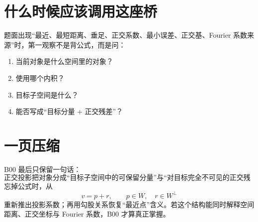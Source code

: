 \documentclass[profile=standard]{ipara-handbook}
\begin{document}
\section{什么时候应该调用这座桥}
题面出现“最近、最短距离、垂足、正交系数、最小误差、正交基、Fourier 系数来源”时，第一观察不是背公式，而是问：
\begin{enumerate}
\item 当前对象是什么空间里的对象？
\item 使用哪个内积？
\item 目标子空间是什么？
\item 能否写成“目标分量 + 正交残差”？
\end{enumerate}

\section{一页压缩}
B00 最后只保留一句话：
\[
\boxed{
\text{正交投影把对象分成“目标子空间中的可保留分量”与“对目标完全不可见的正交残差”。}
}
\]
忘掉公式时，从
\[
v=p+r,\qquad p\in W,\quad r\in W^\perp
\]
重新推出投影系数；再用勾股关系恢复“最近点”含义。若这个结构能同时解释空间距离、正交坐标与 Fourier 系数，B00 才算真正掌握。
\end{document}
